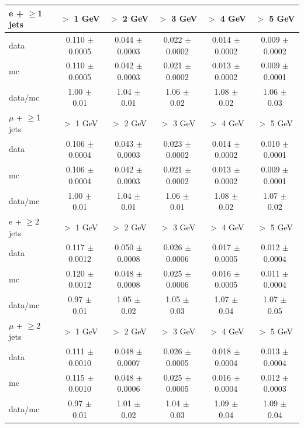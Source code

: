 \begin{table}[!ht]
\begin{center}
\begin{tabular}{l|c|c|c|c|c}
\hline
\hline
e + $\geq$1 jets   &           $>$ 1 GeV   &           $>$ 2 GeV   &           $>$ 3 GeV   &           $>$ 4 GeV   &           $>$ 5 GeV  \\
\hline
      data   &  0.110 $\pm$ 0.0005   &  0.044 $\pm$ 0.0003   &  0.022 $\pm$ 0.0002   &  0.014 $\pm$ 0.0002   &  0.009 $\pm$ 0.0002  \\
        mc   &  0.110 $\pm$ 0.0005   &  0.042 $\pm$ 0.0003   &  0.021 $\pm$ 0.0002   &  0.013 $\pm$ 0.0002   &  0.009 $\pm$ 0.0001  \\
   data/mc   &     1.00 $\pm$ 0.01   &     1.04 $\pm$ 0.01   &     1.06 $\pm$ 0.02   &     1.08 $\pm$ 0.02   &     1.06 $\pm$ 0.03  \\

\hline
\hline
$\mu$ + $\geq$1 jets   &           $>$ 1 GeV   &           $>$ 2 GeV   &           $>$ 3 GeV   &           $>$ 4 GeV   &           $>$ 5 GeV  \\
\hline
      data   &  0.106 $\pm$ 0.0004   &  0.043 $\pm$ 0.0003   &  0.023 $\pm$ 0.0002   &  0.014 $\pm$ 0.0002   &  0.010 $\pm$ 0.0001  \\
        mc   &  0.106 $\pm$ 0.0004   &  0.042 $\pm$ 0.0003   &  0.021 $\pm$ 0.0002   &  0.013 $\pm$ 0.0002   &  0.009 $\pm$ 0.0001  \\
   data/mc   &     1.00 $\pm$ 0.01   &     1.04 $\pm$ 0.01   &     1.06 $\pm$ 0.01   &     1.08 $\pm$ 0.02   &     1.07 $\pm$ 0.02  \\

\hline
\hline
e + $\geq$2 jets   &           $>$ 1 GeV   &           $>$ 2 GeV   &           $>$ 3 GeV   &           $>$ 4 GeV   &           $>$ 5 GeV  \\
\hline
      data   &  0.117 $\pm$ 0.0012   &  0.050 $\pm$ 0.0008   &  0.026 $\pm$ 0.0006   &  0.017 $\pm$ 0.0005   &  0.012 $\pm$ 0.0004  \\
        mc   &  0.120 $\pm$ 0.0012   &  0.048 $\pm$ 0.0008   &  0.025 $\pm$ 0.0006   &  0.016 $\pm$ 0.0005   &  0.011 $\pm$ 0.0004  \\
   data/mc   &     0.97 $\pm$ 0.01   &     1.05 $\pm$ 0.02   &     1.05 $\pm$ 0.03   &     1.07 $\pm$ 0.04   &     1.07 $\pm$ 0.05  \\

\hline
\hline
$\mu$ + $\geq$2 jets   &           $>$ 1 GeV   &           $>$ 2 GeV   &           $>$ 3 GeV   &           $>$ 4 GeV   &           $>$ 5 GeV  \\
\hline
      data   &  0.111 $\pm$ 0.0010   &  0.048 $\pm$ 0.0007   &  0.026 $\pm$ 0.0005   &  0.018 $\pm$ 0.0004   &  0.013 $\pm$ 0.0004  \\
        mc   &  0.115 $\pm$ 0.0010   &  0.048 $\pm$ 0.0006   &  0.025 $\pm$ 0.0005   &  0.016 $\pm$ 0.0004   &  0.012 $\pm$ 0.0003  \\
   data/mc   &     0.97 $\pm$ 0.01   &     1.01 $\pm$ 0.02   &     1.04 $\pm$ 0.03   &     1.09 $\pm$ 0.04   &     1.09 $\pm$ 0.04  \\


\end{tabular}
\end{center}
\end{table}
